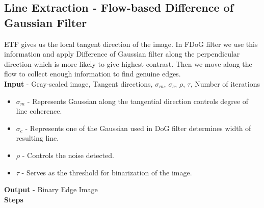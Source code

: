 \documentclass[a4paper]{article}
\begin{document}
\subsection{Line Extraction - Flow-based Difference of Gaussian Filter}

ETF gives us the local tangent direction of the image. In FDoG filter we use this information and apply Difference of Gaussian filter along the perpendicular direction which is more likely to give highest contrast. Then we move along the flow to collect enough information to find genuine edges.
\\
\textbf{Input} - Gray-scaled image, Tangent directions, $\sigma_m$, $\sigma_c$, $\rho$, $\tau$, Number of iterations
\begin{itemize}
\item $\sigma_m$ - Represents Gaussian along the tangential direction controls degree of line coherence.
\item $\sigma_c$ - Represents one of the Gaussian used in DoG filter determines width of resulting line.
\item $\rho$ - Controls the noise detected.
\item $\tau$ - Serves as the threshold for binarization of the image.
\end{itemize}
\textbf{Output} - Binary Edge Image\\
\textbf{Steps}
\end{document}
